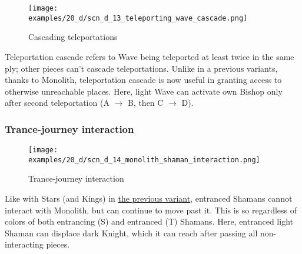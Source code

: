 \vspace*{-0.9\baselineskip}
\noindent
\begin{figure}[!h]
\texttt{[image: examples/20\_d/scn\_d\_13\_teleporting\_wave\_cascade.png]}
\caption{Cascading teleportations}
\label{fig:scn_d_13_teleporting_wave_cascade}
\end{figure}

Teleportation cascade refers to Wave being teleported at least twice in the same ply;
other pieces can't cascade teleportations. Unlike in a previous variants, thanks to
Monolith, teleportation cascade is now useful in granting access to otherwise unreachable
places. Here, light Wave can activate own Bishop only after second teleportation
(A $\rightarrow$ B, then C $\rightarrow$ D).

\clearpage %

\subsubsection*{Trance-journey interaction}

\vspace*{-0.9\baselineskip}
\noindent
\begin{figure}[!h]
\texttt{[image: examples/20\_d/scn\_d\_14\_monolith\_shaman\_interaction.png]}
\caption{Trance-journey interaction}
\label{fig:scn_d_14_monolith_shaman_interaction}
\end{figure}

Like with Stars (and Kings) in \hyperref[fig:scn_cot_18_light_light_shaman_interaction_start]{the previous variant},
entranced Shamans cannot interact with Monolith, but can continue to move past it. This is so regardless of colors
of both entrancing (S) and entranced (T) Shamans. Here, entranced light Shaman can displace dark Knight, which it
can reach after passing all non-interacting pieces.

\clearpage %

